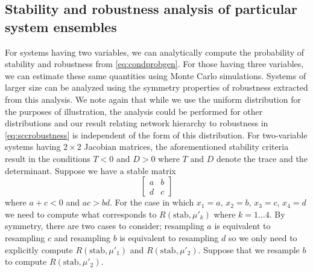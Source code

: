 \subsection{Stability and robustness analysis of particular system ensembles}
For systems having two variables, we can analytically compute the probability of stability and robustness from \ref{eq:condprobgen}. For those having three variables, we can estimate these same quantities using Monte Carlo simulations. Systems of larger size can be analyzed using the symmetry properties of robustness extracted from this analysis. We note again that while we use the uniform distribution for the purposes of illustration, the analysis could be performed for other distributions and our result relating network hierarchy to robustness in \ref{eq:sccrobustness} is independent of the form of this distribution. For two-variable systems having $2 \times 2$ Jacobian matrices, the aforementioned stability criteria result in the conditions $T < 0$ and $D >
0$ where $T$ and $D$ denote the trace and the determinant. Suppose we have a stable matrix
$$
\begin{bmatrix}
a & b \\
d & c
\end{bmatrix}
$$
where $a + c < 0$ and $ac > bd$.  For the case in which $x_1=a,\,x_2=b,\,x_3=c,\,x_4=d$ we need to compute what corresponds to $R(\mathrm{stab},\mu'_k)$ where $k=1 \ldots 4$. By symmetry, there are two cases to consider; resampling $a$ is equivalent to resampling $c$ and resampling $b$ is equivalent to resampling $d$ so we only need to explicitly compute $ R(\mathrm{stab},\mu'_1)$ and $R(\mathrm{stab},\mu'_2)$. Suppose that we resample $b$ to compute $R(\mathrm{stab},\mu'_2)$.
